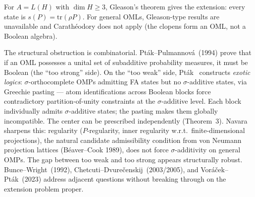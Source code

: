 For $A=L(H)$ with $\dim H\geq3$, Gleason's theorem gives the
extension: every state is $s(P)=\mathrm{tr}(\rho P)$.  For general
OMLs, Gleason-type results are unavailable and Carath\'{e}odory does
not apply (the clopens form an OML, not a Boolean algebra).

The structural obstruction is combinatorial.
Pt\'{a}k--Pulmannov\'{a}~(1994) prove that if an OML possesses a
unital set of subadditive probability measures, it must be Boolean
(the ``too strong'' side).  On the ``too weak'' side,
Pt\'{a}k~\cite{Ptak1987} constructs \emph{exotic logics}:
$\sigma$-orthocomplete OMPs admitting FA states but no
$\sigma$-additive states, via Greechie pasting --- atom
identifications across Boolean blocks force contradictory
partition-of-unity constraints at the $\sigma$-additive level.
Each block individually admits $\sigma$-additive states; the
pasting makes them globally incompatible.  The center can be
prescribed independently (Theorem~3).  Navara~\cite{Navara1992}
sharpens this: regularity ($P$-regularity, inner regularity
w.r.t.\ finite-dimensional projections), the natural candidate
admissibility condition from von Neumann projection lattices
(B\'{e}aver--Cook 1989), does not force $\sigma$-additivity on
general OMPs.  The gap between too weak and too strong appears
structurally robust.  Bunce--Wright~(1992), Chetcuti--Dvure\v{c}en\-skij~(2003/2005), and
Vor\'{a}\v{c}ek--Pt\'{a}k~(2023) address adjacent questions
without breaking through on the extension problem proper.

